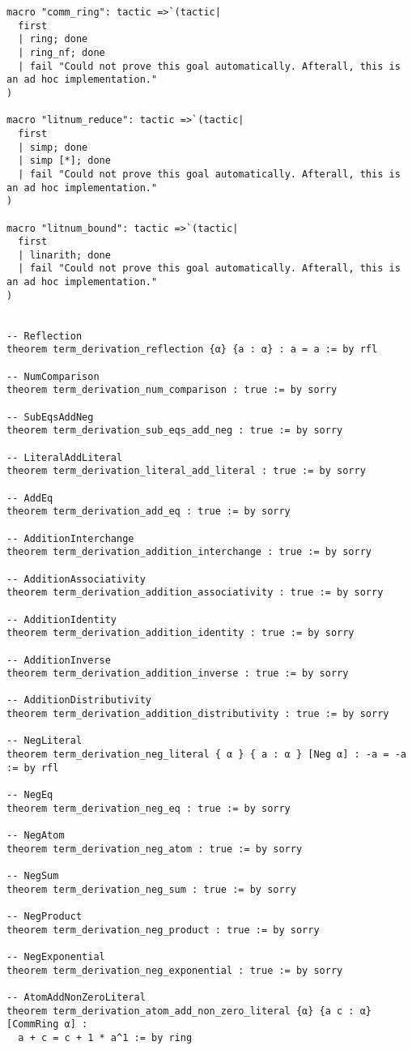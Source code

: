 \documentclass{article}
\begin{document}
\begin{tcolorbox}[colback=white!10, width=\linewidth]
\begin{lstlisting}[language=Lean4]
macro "comm_ring": tactic =>`(tactic|
  first
  | ring; done
  | ring_nf; done
  | fail "Could not prove this goal automatically. Afterall, this is an ad hoc implementation."
)

macro "litnum_reduce": tactic =>`(tactic|
  first
  | simp; done
  | simp [*]; done
  | fail "Could not prove this goal automatically. Afterall, this is an ad hoc implementation."
)

macro "litnum_bound": tactic =>`(tactic|
  first
  | linarith; done
  | fail "Could not prove this goal automatically. Afterall, this is an ad hoc implementation."
)


-- Reflection
theorem term_derivation_reflection {α} {a : α} : a = a := by rfl

-- NumComparison
theorem term_derivation_num_comparison : true := by sorry

-- SubEqsAddNeg
theorem term_derivation_sub_eqs_add_neg : true := by sorry

-- LiteralAddLiteral
theorem term_derivation_literal_add_literal : true := by sorry

-- AddEq
theorem term_derivation_add_eq : true := by sorry

-- AdditionInterchange
theorem term_derivation_addition_interchange : true := by sorry

-- AdditionAssociativity
theorem term_derivation_addition_associativity : true := by sorry

-- AdditionIdentity
theorem term_derivation_addition_identity : true := by sorry

-- AdditionInverse
theorem term_derivation_addition_inverse : true := by sorry

-- AdditionDistributivity
theorem term_derivation_addition_distributivity : true := by sorry

-- NegLiteral
theorem term_derivation_neg_literal { α } { a : α } [Neg α] : -a = -a := by rfl

-- NegEq
theorem term_derivation_neg_eq : true := by sorry

-- NegAtom
theorem term_derivation_neg_atom : true := by sorry

-- NegSum
theorem term_derivation_neg_sum : true := by sorry

-- NegProduct
theorem term_derivation_neg_product : true := by sorry

-- NegExponential
theorem term_derivation_neg_exponential : true := by sorry

-- AtomAddNonZeroLiteral
theorem term_derivation_atom_add_non_zero_literal {α} {a c : α} [CommRing α] : 
  a + c = c + 1 * a^1 := by ring


\end{lstlisting}
\end{tcolorbox}
\end{document}
